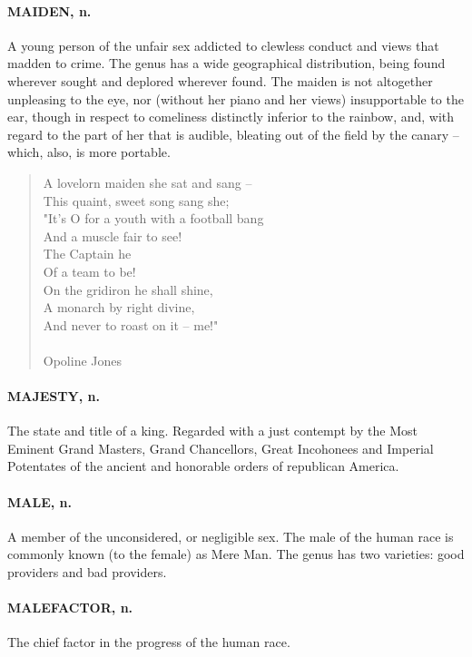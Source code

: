 \documentclass[11pt]{article}
\begin{document}
\paragraph{MAIDEN, n.}  A young person of the unfair sex addicted to clewless
conduct and views that madden to crime.  The genus has a wide
geographical distribution, being found wherever sought and deplored
wherever found.  The maiden is not altogether unpleasing to the eye,
nor (without her piano and her views) insupportable to the ear, though
in respect to comeliness distinctly inferior to the rainbow, and, with
regard to the part of her that is audible, bleating out of the field
by the canary -- which, also, is more portable.

\begin{quote}   A lovelorn maiden she sat and sang -- \\
      This quaint, sweet song sang she; \\
  "It's O for a youth with a football bang \\
      And a muscle fair to see! \\
              The Captain he \\
              Of a team to be! \\
  On the gridiron he shall shine, \\
  A monarch by right divine, \\
      And never to roast on it -- me!" \\
 \\
Opoline Jones \end{quote}


\paragraph{MAJESTY, n.}  The state and title of a king.  Regarded with a just
contempt by the Most Eminent Grand Masters, Grand Chancellors, Great
Incohonees and Imperial Potentates of the ancient and honorable orders
of republican America.

\paragraph{MALE, n.}  A member of the unconsidered, or negligible sex.  The male
of the human race is commonly known (to the female) as Mere Man.  The
genus has two varieties:  good providers and bad providers.

\paragraph{MALEFACTOR, n.}  The chief factor in the progress of the human race.
\end{document}
